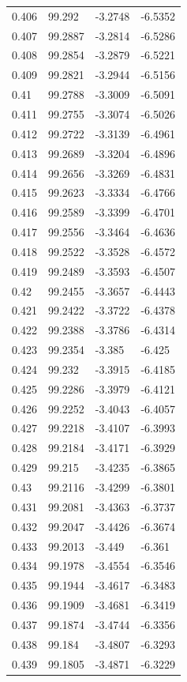 \begin{tabular}{llll}
0.406 & 99.292 & -3.2748 & -6.5352 \\
0.407 & 99.2887 & -3.2814 & -6.5286 \\
0.408 & 99.2854 & -3.2879 & -6.5221 \\
0.409 & 99.2821 & -3.2944 & -6.5156 \\
0.41 & 99.2788 & -3.3009 & -6.5091 \\
0.411 & 99.2755 & -3.3074 & -6.5026 \\
0.412 & 99.2722 & -3.3139 & -6.4961 \\
0.413 & 99.2689 & -3.3204 & -6.4896 \\
0.414 & 99.2656 & -3.3269 & -6.4831 \\
0.415 & 99.2623 & -3.3334 & -6.4766 \\
0.416 & 99.2589 & -3.3399 & -6.4701 \\
0.417 & 99.2556 & -3.3464 & -6.4636 \\
0.418 & 99.2522 & -3.3528 & -6.4572 \\
0.419 & 99.2489 & -3.3593 & -6.4507 \\
0.42 & 99.2455 & -3.3657 & -6.4443 \\
0.421 & 99.2422 & -3.3722 & -6.4378 \\
0.422 & 99.2388 & -3.3786 & -6.4314 \\
0.423 & 99.2354 & -3.385 & -6.425 \\
0.424 & 99.232 & -3.3915 & -6.4185 \\
0.425 & 99.2286 & -3.3979 & -6.4121 \\
0.426 & 99.2252 & -3.4043 & -6.4057 \\
0.427 & 99.2218 & -3.4107 & -6.3993 \\
0.428 & 99.2184 & -3.4171 & -6.3929 \\
0.429 & 99.215 & -3.4235 & -6.3865 \\
0.43 & 99.2116 & -3.4299 & -6.3801 \\
0.431 & 99.2081 & -3.4363 & -6.3737 \\
0.432 & 99.2047 & -3.4426 & -6.3674 \\
0.433 & 99.2013 & -3.449 & -6.361 \\
0.434 & 99.1978 & -3.4554 & -6.3546 \\
0.435 & 99.1944 & -3.4617 & -6.3483 \\
0.436 & 99.1909 & -3.4681 & -6.3419 \\
0.437 & 99.1874 & -3.4744 & -6.3356 \\
0.438 & 99.184 & -3.4807 & -6.3293 \\
0.439 & 99.1805 & -3.4871 & -6.3229 \\

\end{tabular}
